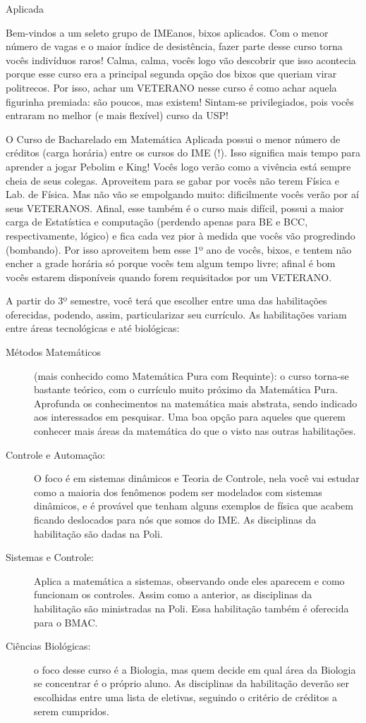 \begin{subsecao}{Aplicada}

Bem-vindos a um seleto grupo de IMEanos, bixos aplicados. Com o menor número de
vagas e o maior índice de desistência, fazer parte desse curso torna vocês
indivíduos raros!  Calma, calma, vocês logo vão descobrir que isso acontecia
porque esse curso era a principal segunda opção dos bixos que queriam virar
politrecos. Por isso, achar um VETERANO nesse curso é como achar aquela
figurinha premiada: são poucos, mas existem! Sintam-se privilegiados, pois vocês
entraram no melhor (e mais flexível) curso da USP!

O Curso de Bacharelado em Matemática Aplicada possui o menor número de créditos
(carga horária) entre os cursos do IME (!). Isso significa mais tempo para
aprender a jogar Pebolim e King! Vocês logo verão como a vivência está sempre
cheia de seus colegas.  Aproveitem para se gabar por vocês não terem Física e
Lab. de Física. Mas não vão se empolgando muito: dificilmente vocês verão por aí
seus VETERANOS. Afinal, esse também é o curso mais difícil, possui a maior carga
de Estatística e computação (perdendo apenas para BE e BCC, respectivamente,
lógico) e fica cada vez pior à medida que vocês vão progredindo (bombando). Por
isso aproveitem bem esse 1º ano de vocês, bixos, e tentem não encher a grade
horária só porque vocês tem algum tempo livre; afinal é bom vocês estarem
disponíveis quando forem requisitados por um VETERANO.

A partir do 3º semestre, você terá que escolher entre uma das habilitações
oferecidas, podendo, assim, particularizar seu currículo. As habilitações variam
entre áreas tecnológicas e até biológicas:
\begin{description}
\item [Métodos Matemáticos] (mais conhecido como Matemática Pura com Requinte):
  o curso torna-se bastante teórico, com o currículo muito próximo da Matemática
  Pura. Aprofunda os conhecimentos na matemática mais abstrata, sendo indicado
  aos interessados em pesquisar. Uma boa opção para aqueles que querem conhecer
  mais áreas da matemática do que o visto nas outras habilitações.
\item [Controle e Automação:]  O foco é em sistemas dinâmicos e Teoria de
  Controle, nela você vai estudar como a maioria dos fenômenos podem ser
  modelados com sistemas dinâmicos, e é provável que tenham alguns exemplos de
  física que acabem ficando deslocados para nós que somos do IME. As disciplinas
  da habilitação são dadas na Poli.
\item [Sistemas e Controle:] Aplica a matemática a sistemas, observando onde
  eles aparecem e como funcionam os controles. Assim como a anterior, as
  disciplinas da habilitação são ministradas na Poli. Essa habilitação também é
  oferecida para o BMAC.
\item [Ciências Biológicas:] o foco desse curso é a Biologia, mas quem decide em
  qual área da Biologia se concentrar é o próprio aluno. As disciplinas da
  habilitação deverão ser escolhidas entre uma lista de eletivas, seguindo o
  critério de créditos a serem cumpridos.
\end{description}


\end{subsecao}
